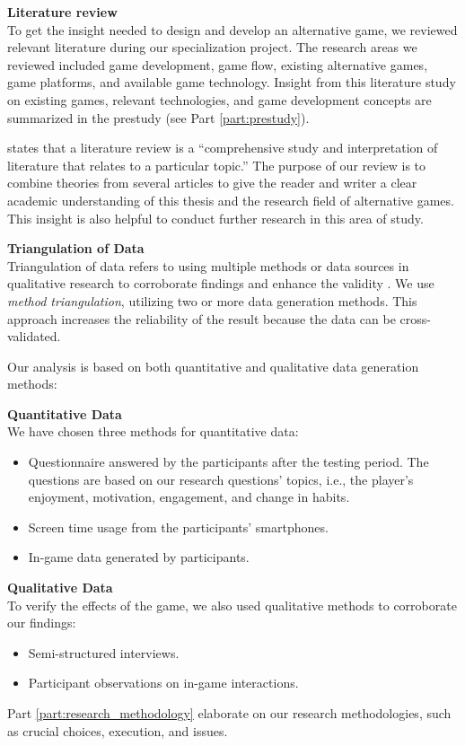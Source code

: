 \textbf{Literature review}\\
To get the insight needed to design and develop an alternative game, we reviewed relevant literature during our specialization project. The research areas we reviewed included game development, game flow, existing alternative games, game platforms, and available game technology. Insight from this literature study on existing games, relevant technologies, and game development concepts are summarized in the prestudy (see Part \ref{part:prestudy}). 

\citet{aveyard_doing_2014} states that a literature review is a “comprehensive study and interpretation of literature that relates to a particular topic.” The purpose of our review is to combine theories from several articles to give the reader and writer a clear academic understanding of this thesis and the research field of alternative games. This insight is also helpful to conduct further research in this area of study.

\textbf{Triangulation of Data} \\
Triangulation of data refers to using multiple methods or data sources in qualitative research to corroborate findings and enhance the validity \citep{oates_researching_2006}. We use \textit{method triangulation}, utilizing two or more data generation methods. This approach increases the reliability of the result because the data can be cross-validated. 

Our analysis is based on both quantitative and qualitative data generation methods:

\textbf{Quantitative Data} \\
We have chosen three methods for quantitative data:
\begin{itemize}
    \item Questionnaire answered by the participants after the testing period. The questions are based on our research questions’ topics, i.e., the player's enjoyment, motivation, engagement, and change in habits.
    \item Screen time usage from the participants' smartphones.
    \item In-game data generated by participants.
\end{itemize}

\textbf{Qualitative Data} \\
To verify the effects of the game, we also used qualitative methods to corroborate our findings:

\begin{itemize}
    \item Semi-structured interviews.
    \item Participant observations on in-game interactions.
\end{itemize}


Part \ref{part:research_methodology} elaborate on our research methodologies, such as crucial choices, execution, and issues.
